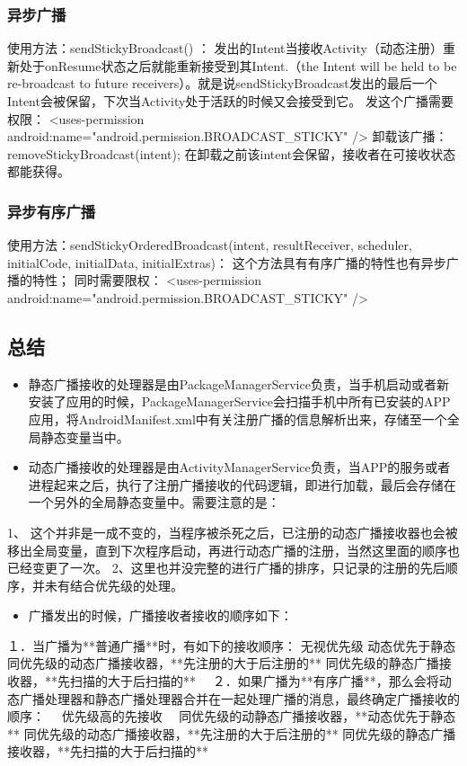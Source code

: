 \documentclass[9pt, b5paper]{article}
\begin{document}
\subsubsection{异步广播}
\label{sec-13-4-3}
使用方法：sendStickyBroadcast() ：
发出的Intent当接收Activity（动态注册）重新处于onResume状态之后就能重新接受到其Intent.（the Intent will be held to be re-broadcast to future receivers）。就是说sendStickyBroadcast发出的最后一个Intent会被保留，下次当Activity处于活跃的时候又会接受到它。
发这个广播需要权限：
<uses-permission android:name="android.permission.BROADCAST\_STICKY" />
卸载该广播：
removeStickyBroadcast(intent);
在卸载之前该intent会保留，接收者在可接收状态都能获得。
\subsubsection{异步有序广播}
\label{sec-13-4-4}
使用方法：sendStickyOrderedBroadcast(intent, resultReceiver, scheduler,
       initialCode, initialData, initialExtras)：
这个方法具有有序广播的特性也有异步广播的特性；
同时需要限权：
 <uses-permission android:name="android.permission.BROADCAST\_STICKY" /> 
\subsection{总结}
\label{sec-13-5}
\begin{itemize}
\item 静态广播接收的处理器是由PackageManagerService负责，当手机启动或者新安装了应用的时候，PackageManagerService会扫描手机中所有已安装的APP应用，将AndroidManifest.xml中有关注册广播的信息解析出来，存储至一个全局静态变量当中。
\item 动态广播接收的处理器是由ActivityManagerService负责，当APP的服务或者进程起来之后，执行了注册广播接收的代码逻辑，即进行加载，最后会存储在一个另外的全局静态变量中。需要注意的是：
\end{itemize}
1、 这个并非是一成不变的，当程序被杀死之后，已注册的动态广播接收器也会被移出全局变量，直到下次程序启动，再进行动态广播的注册，当然这里面的顺序也已经变更了一次。
2、这里也并没完整的进行广播的排序，只记录的注册的先后顺序，并未有结合优先级的处理。
\begin{itemize}
\item 广播发出的时候，广播接收者接收的顺序如下：
\end{itemize}
１．当广播为**普通广播**时，有如下的接收顺序：
无视优先级
动态优先于静态
同优先级的动态广播接收器，**先注册的大于后注册的**
同优先级的静态广播接收器，**先扫描的大于后扫描的**　
２．如果广播为**有序广播**，那么会将动态广播处理器和静态广播处理器合并在一起处理广播的消息，最终确定广播接收的顺序：　
优先级高的先接收　
同优先级的动静态广播接收器，**动态优先于静态**
同优先级的动态广播接收器，**先注册的大于后注册的**
同优先级的静态广播接收器，**先扫描的大于后扫描的**　
\end{document}
